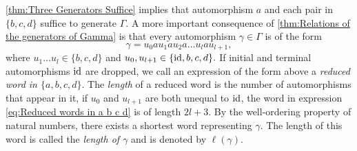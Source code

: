 \cref{thm:Three Generators Suffice} implies that automorphism $a$ and each pair in $\lbrace b,c,d\rbrace$ suffice to generate $\Gamma.$ A more important consequence of \cref{thm:Relations of the generators of Gamma} is that every automorphism $\gamma\in\Gamma$ is of the form
\begin{equation}\label{eq:Reduced words in a b c d}
\gamma=u_0au_1au_2a\ldots u_lau_{l+1},
\end{equation}
where $u_1\ldots u_{l}\in\lbrace b,c,d\rbrace$ and $u_0,u_{l+1}\in\lbrace \operatorname{id},b,c,d\rbrace.$ If initial and terminal automorphisms $\operatorname{id}$ are dropped, we call an expression of the form above a \emph{reduced word in $\lbrace a,b,c,d\rbrace$}. The \emph{length} of a reduced word is the number of automorphisms that appear in it, \eg{} if $u_0$ and $u_{l+1}$ are both unequal to $\operatorname{id}$, the word in expression \ref{eq:Reduced words in a b c d} is of length $2l+3$. By the well-ordering property of natural numbers, there exists a shortest word representing $\gamma$. The length of this word is called the \emph{length of $\gamma$} and is denoted by $\ell(\gamma)$. 